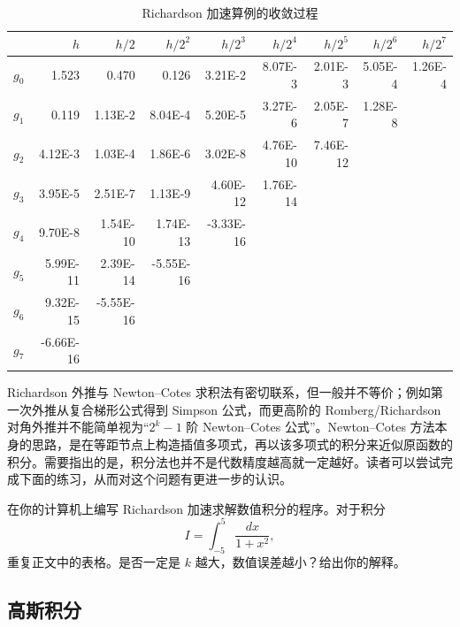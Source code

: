 \begin{table}[htbp]
\centering
\caption{Richardson 加速算例的收敛过程}
\label{tab:richardson-example}
\scriptsize
\setlength{\tabcolsep}{4pt}
\begin{tabular}{c*{8}{r}}
\toprule
& $h$ & $h/2$ & $h/2^2$ & $h/2^3$ & $h/2^4$ & $h/2^5$ & $h/2^6$ & $h/2^7$\\
\midrule
$g_0$ & 1.523 & 0.470 & 0.126 & 3.21E-2 & 8.07E-3 & 2.01E-3 & 5.05E-4 & 1.26E-4\\
$g_1$ & 0.119 & 1.13E-2 & 8.04E-4 & 5.20E-5 & 3.27E-6 & 2.05E-7 & 1.28E-8 & \\
$g_2$ & 4.12E-3 & 1.03E-4 & 1.86E-6 & 3.02E-8 & 4.76E-10 & 7.46E-12 & & \\
$g_3$ & 3.95E-5 & 2.51E-7 & 1.13E-9 & 4.60E-12 & 1.76E-14 & & & \\
$g_4$ & 9.70E-8 & 1.54E-10 & 1.74E-13 & -3.33E-16 & & & & \\
$g_5$ & 5.99E-11 & 2.39E-14 & -5.55E-16 & & & & & \\
$g_6$ & 9.32E-15 & -5.55E-16 & & & & & & \\
$g_7$ & -6.66E-16 & & & & & & & \\
\bottomrule
\end{tabular}
\end{table}

Richardson 外推与 Newton--Cotes 求积法有密切联系，但一般并不等价；例如第一次外推从复合梯形公式得到 Simpson 公式，而更高阶的 Romberg/Richardson 对角外推并不能简单视为“$2^k-1$ 阶 Newton--Cotes 公式”。Newton--Cotes 方法本身的思路，是在等距节点上构造插值多项式，再以该多项式的积分来近似原函数的积分。需要指出的是，积分法也并不是代数精度越高就一定越好。读者可以尝试完成下面的练习，从而对这个问题有更进一步的认识。

\begin{exerciseBox}[练习 2.1]
在你的计算机上编写 Richardson 加速求解数值积分的程序。对于积分
\[
I=\int_{-5}^{5}\frac{dx}{1+x^2},
\]
重复正文中的表格。是否一定是 $k$ 越大，数值误差越小？给出你的解释。
\end{exerciseBox}




\subsection{高斯积分}

